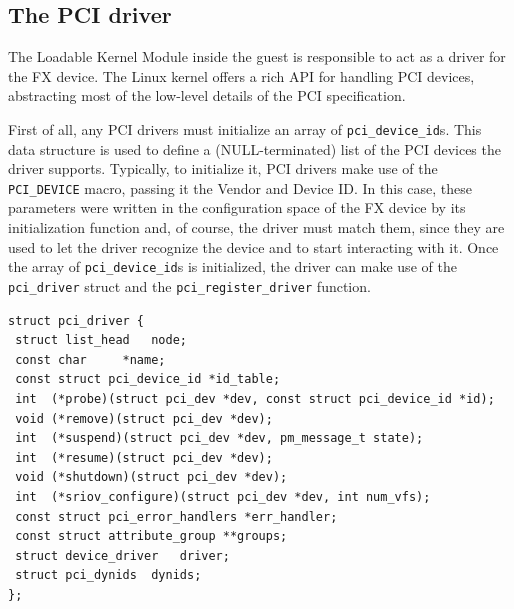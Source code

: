 \subsection{The PCI driver}
The Loadable Kernel Module inside the guest is responsible to act as a driver for the FX device. The Linux kernel offers a rich API for handling PCI devices, abstracting most of the low-level details of the PCI specification. 
\par
First of all, any PCI drivers must initialize an array of \texttt{pci\_device\_id}s. This data structure is used to define a (NULL-terminated) list of the PCI devices the driver supports. Typically, to initialize it, PCI drivers make use of the \texttt{PCI\_DEVICE} macro, passing it the Vendor and Device ID. In this case, these parameters were written in the configuration space of the FX device by its initialization function and, of course, the driver must match them, since they are used to let the driver recognize the device and to start interacting with it. Once the array of \texttt{pci\_device\_id}s is initialized, the driver can make use of the \texttt{pci\_driver} struct and the \texttt{pci\_register\_driver} function. 
\begin{lstlisting}[style=c, caption={\texttt{pci\_driver} struct}, label={list:pcidriver}]
struct pci_driver {
 struct list_head	node;
 const char		*name;
 const struct pci_device_id *id_table;	
 int  (*probe)(struct pci_dev *dev, const struct pci_device_id *id);	
 void (*remove)(struct pci_dev *dev);	
 int  (*suspend)(struct pci_dev *dev, pm_message_t state);	
 int  (*resume)(struct pci_dev *dev);
 void (*shutdown)(struct pci_dev *dev);
 int  (*sriov_configure)(struct pci_dev *dev, int num_vfs); 
 const struct pci_error_handlers *err_handler;
 const struct attribute_group **groups;
 struct device_driver	driver;
 struct pci_dynids	dynids;
};
\end{lstlisting}
